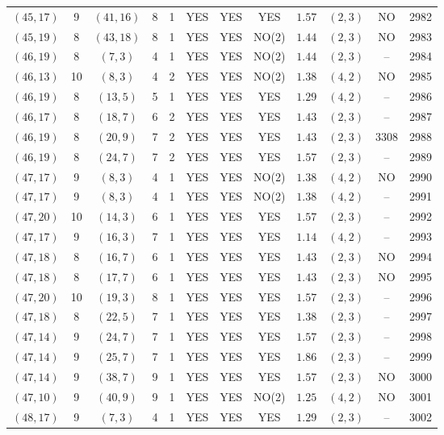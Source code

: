 \begin{longtable}{|c|c|c|c|c|c|c|c|c|c|c|c|}
$(45,17)$ & 9 & $(41,16)$ & 8 & 1 & YES & YES & YES & $1.57$ & $(2,3)$ & NO & 2982\\
$(45,19)$ & 8 & $(43,18)$ & 8 & 1 & YES & YES & NO(2) & $1.44$ & $(2,3)$ & NO & 2983\\
$(46,19)$ & 8 & $(7,3)$ & 4 & 1 & YES & YES & NO(2) & $1.44$ & $(2,3)$ & -- & 2984\\
$(46,13)$ & 10 & $(8,3)$ & 4 & 2 & YES & YES & NO(2) & $1.38$ & $(4,2)$ & NO & 2985\\
$(46,19)$ & 8 & $(13,5)$ & 5 & 1 & YES & YES & YES & $1.29$ & $(4,2)$ & -- & 2986\\
$(46,17)$ & 8 & $(18,7)$ & 6 & 2 & YES & YES & YES & $1.43$ & $(2,3)$ & -- & 2987\\
$(46,19)$ & 8 & $(20,9)$ & 7 & 2 & YES & YES & YES & $1.43$ & $(2,3)$ & 3308 & 2988\\
$(46,19)$ & 8 & $(24,7)$ & 7 & 2 & YES & YES & YES & $1.57$ & $(2,3)$ & -- & 2989\\
$(47,17)$ & 9 & $(8,3)$ & 4 & 1 & YES & YES & NO(2) & $1.38$ & $(4,2)$ & NO & 2990\\
$(47,17)$ & 9 & $(8,3)$ & 4 & 1 & YES & YES & NO(2) & $1.38$ & $(4,2)$ & -- & 2991\\
$(47,20)$ & 10 & $(14,3)$ & 6 & 1 & YES & YES & YES & $1.57$ & $(2,3)$ & -- & 2992\\
$(47,17)$ & 9 & $(16,3)$ & 7 & 1 & YES & YES & YES & $1.14$ & $(4,2)$ & -- & 2993\\
$(47,18)$ & 8 & $(16,7)$ & 6 & 1 & YES & YES & YES & $1.43$ & $(2,3)$ & NO & 2994\\
$(47,18)$ & 8 & $(17,7)$ & 6 & 1 & YES & YES & YES & $1.43$ & $(2,3)$ & NO & 2995\\
$(47,20)$ & 10 & $(19,3)$ & 8 & 1 & YES & YES & YES & $1.57$ & $(2,3)$ & -- & 2996\\
$(47,18)$ & 8 & $(22,5)$ & 7 & 1 & YES & YES & YES & $1.38$ & $(2,3)$ & -- & 2997\\
$(47,14)$ & 9 & $(24,7)$ & 7 & 1 & YES & YES & YES & $1.57$ & $(2,3)$ & -- & 2998\\
$(47,14)$ & 9 & $(25,7)$ & 7 & 1 & YES & YES & YES & $1.86$ & $(2,3)$ & -- & 2999\\
$(47,14)$ & 9 & $(38,7)$ & 9 & 1 & YES & YES & YES & $1.57$ & $(2,3)$ & NO & 3000\\
$(47,10)$ & 9 & $(40,9)$ & 9 & 1 & YES & YES & NO(2) & $1.25$ & $(4,2)$ & NO & 3001\\
$(48,17)$ & 9 & $(7,3)$ & 4 & 1 & YES & YES & YES & $1.29$ & $(2,3)$ & -- & 3002\\

\end{longtable}
